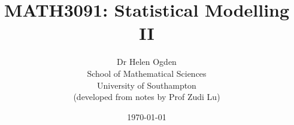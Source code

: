 \title{\huge \bf MATH3091: Statistical Modelling II \\}

\author{Dr Helen Ogden \\ School of Mathematical Sciences \\ University of Southampton
\\ \vspace{\baselineskip} (developed from notes by Prof Zudi Lu) \vspace{\baselineskip}}

\date{\today}

\maketitle

\thispagestyle{empty}
